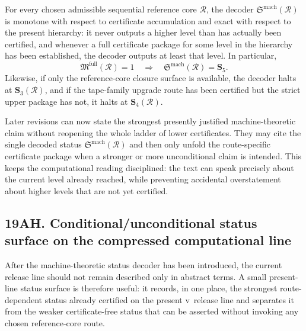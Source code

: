 \begin{proposition}
For every chosen admissible sequential reference core \(\mathcal R\), the decoder \(\mathfrak S^{\mathrm{mach}}(\mathcal R)\) is monotone with respect to certificate accumulation and exact with respect to the present hierarchy: it never outputs a higher level than has actually been certified, and whenever a full certificate package for some level in the hierarchy has been established, the decoder outputs at least that level. In particular,
\[
\mathfrak M^{\mathrm{full}}(\mathcal R)=1
\quad\Longrightarrow\quad
\mathfrak S^{\mathrm{mach}}(\mathcal R)=\mathbf S_5.
\]
Likewise, if only the reference-core closure surface is available, the decoder halts at \(\mathbf S_3(\mathcal R)\), and if the tape-family upgrade route has been certified but the strict upper package has not, it halts at \(\mathbf S_4(\mathcal R)\).
\end{proposition}

\begin{corollary}
Later revisions can now state the strongest presently justified machine-theoretic claim without reopening the whole ladder of lower certificates. They may cite the single decoded status \(\mathfrak S^{\mathrm{mach}}(\mathcal R)\) and then only unfold the route-specific certificate package when a stronger or more unconditional claim is intended. This keeps the computational reading disciplined: the text can speak precisely about the current level already reached, while preventing accidental overstatement about higher levels that are not yet certified.

\end{corollary}


\subsection*{19AH. Conditional/unconditional status surface on the compressed computational line}
After the machine-theoretic status decoder has been introduced, the current release line should not remain described only in abstract terms. A small present-line status surface is therefore useful: it records, in one place, the strongest route-dependent status already certified on the present v\docversion\ release line and separates it from the weaker certificate-free status that can be asserted without invoking any chosen reference-core route.

